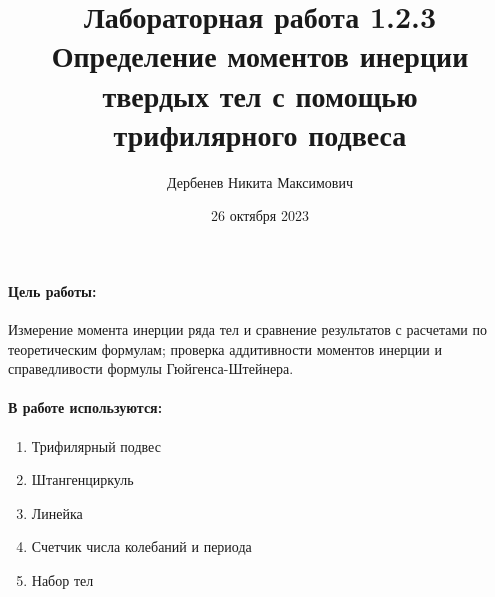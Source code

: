 \documentclass[a4paper, 10pt]{article}%
\author{Дербенев Никита Максимович}
\title{Лабораторная работа 1.2.3\\
	Определение моментов инерции твердых тел с помощью трифилярного подвеса}
\date{26 октября 2023}
\begin{document}
	\maketitle
	\paragraph {Цель работы:}
	Измерение момента инерции ряда тел и сравнение результатов с расчетами по теоретическим формулам; проверка аддитивности моментов инерции и справедливости формулы Гюйгенса-Штейнера.
	\paragraph{В работе используются:}
	\begin{enumerate}
		\item Трифилярный подвес
		\item Штангенциркуль
		\item Линейка
		\item Счетчик числа колебаний и периода
		\item Набор тел
	\end{enumerate}
\end{document}
